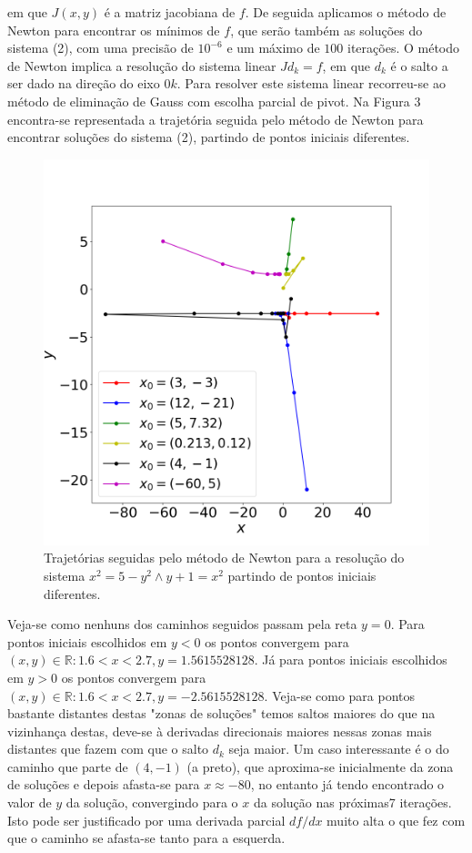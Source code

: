 \documentclass[aps,pre,twocolumn,showpacs,amsmath,amssymb]{revtex4-1}
\begin{document}
em que $J(x,y)$ é a matriz jacobiana de $f$. De seguida aplicamos o método de Newton para encontrar os mínimos de $f$, que serão também as soluções do sistema (2), com uma precisão de $10^{-6}$ e um máximo de $100$ iterações. O método de Newton implica a resolução do sistema linear $Jd_k=f$, em que $d_k$ é o salto a ser dado na direção do eixo $0k$. Para resolver este sistema linear recorreu-se ao método de eliminação de Gauss com escolha parcial de pivot. Na Figura 3 encontra-se representada a trajetória seguida pelo método de Newton para encontrar soluções do sistema (2), partindo de pontos iniciais diferentes.
\begin{figure}[hbt!]
  \includegraphics[width=\columnwidth]{nonlinearsystemtrajectorie.png}
  \caption{Trajetórias seguidas pelo método de Newton para a resolução do sistema $x^2=5-y^2 \wedge y+1=x^2$ partindo de pontos iniciais diferentes.}
  \label{graficosistema2}
\end{figure}
Veja-se como nenhuns dos caminhos seguidos passam pela reta $y=0$. Para pontos iniciais escolhidos em $y<0$ os pontos convergem para ${(x,y)\in \mathbb{R}: 1.6<x<2.7, y=1.5615528128}$. Já para pontos iniciais escolhidos em $y>0$ os pontos convergem para ${(x,y)\in \mathbb{R}: 1.6<x<2.7, y=-2.5615528128}$. Veja-se como para pontos bastante distantes destas "zonas de soluções" temos saltos maiores do que na vizinhança destas, deve-se à derivadas direcionais maiores nessas zonas mais distantes que fazem com que o salto $d_k$ seja maior. Um caso interessante é o do caminho que parte de $(4,-1)$ (a preto), que aproxima-se inicialmente da zona de soluções e depois afasta-se para $x\approx-80$, no entanto já tendo encontrado o valor de $y$ da solução, convergindo para o $x$ da solução nas próximas7 iterações. Isto pode ser justificado por uma derivada parcial $df/dx$ muito alta o que fez com que o caminho se afasta-se tanto para a esquerda.
\end{document}
